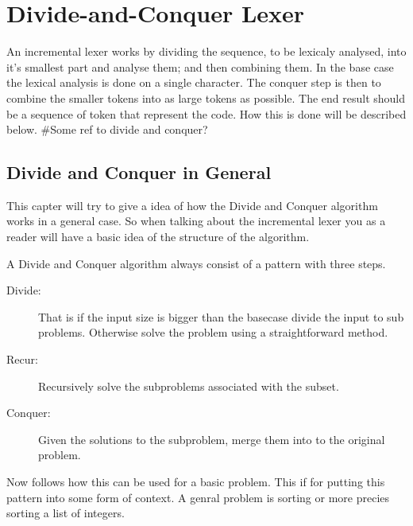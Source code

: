 \chapter{Divide-and-Conquer Lexer}
An incremental lexer works by dividing the sequence, to be lexicaly analysed,
into it's smallest part and analyse them; and then combining them. In the base
case the lexical analysis is done on a single character. The conquer step is
then to combine the smaller tokens into as large tokens as possible. The end
result should be a sequence of token that represent the code. How this is done
will be described below. \#Some ref to divide and conquer?

\section{Divide and Conquer in General}
This capter will try to give a idea of how the Divide and Conquer algorithm works in a general case. So when talking about the incremental lexer you as a reader will have a basic idea of the structure of the algorithm.

A Divide and Conquer algorithm always consist of a pattern with three steps. \cite{Goodrich}
\begin{description}
\item[Divide:] That is if the input size is bigger than the basecase divide the input to sub problems. Otherwise solve the problem using a straightforward method.
\item[Recur:] Recursively solve the subproblems associated with the subset.
\item[Conquer:] Given the solutions to the subproblem, merge them into to the original problem.
\end{description}
Now follows how this can be used for a basic problem. This if for putting this pattern into some form of context. A genral problem is sorting or more precies sorting a list of integers. 

